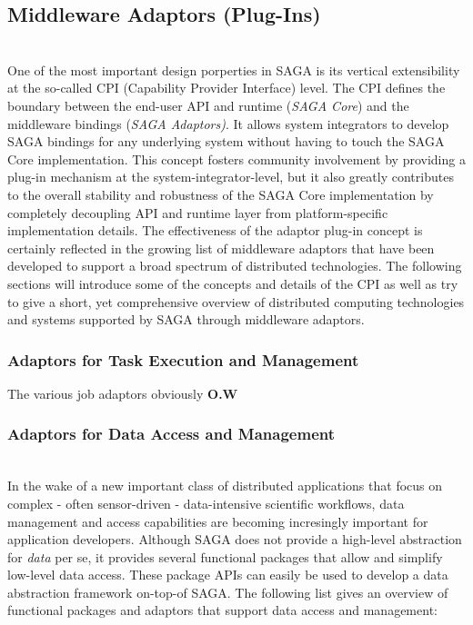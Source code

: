   \subsection{Middleware Adaptors (Plug-Ins)}
  \\
   One of the most important design porperties in SAGA is its vertical
   extensibility at the so-called CPI (Capability Provider Interface) level.
   The CPI defines the boundary between the end-user  API and runtime (\textit{SAGA Core}) and the middleware
   bindings (\textit{SAGA Adaptors)}.  It allows system integrators to develop
   SAGA bindings for any underlying system without having to touch the SAGA
   Core implementation.  This concept fosters community involvement by
   providing a plug-in mechanism at the  system-integrator-level, but it also greatly contributes to the
   overall stability and robustness of the SAGA Core implementation by
   completely decoupling API and runtime layer from platform-specific
   implementation details. The effectiveness of the adaptor plug-in concept is
   certainly reflected in the growing list of middleware adaptors that have
   been developed to support a broad spectrum of distributed technologies. The
   following sections will introduce some of the concepts and details of the
   CPI as well as try to give a short, yet comprehensive overview of
   distributed computing technologies and systems supported by SAGA through
   middleware adaptors.

 
  \subsubsection{Adaptors for Task Execution and Management} 
  The various job adaptors obviously \textbf{O.W}


  \subsubsection{Adaptors for Data Access and Management} 
  \\
  In the wake of a new important class of distributed applications that focus
  on complex - often sensor-driven - data-intensive scientific workflows, data
  management and access capabilities are becoming incresingly important for
  application developers. Although SAGA does not provide a high-level
  abstraction for \textit{data} per se, it provides several functional packages
  that allow and simplify low-level data access. These package APIs can easily
  be used to develop a data abstraction framework on-top-of SAGA. The following
  list gives an overview of functional packages and adaptors that support data
  access and management:
    
